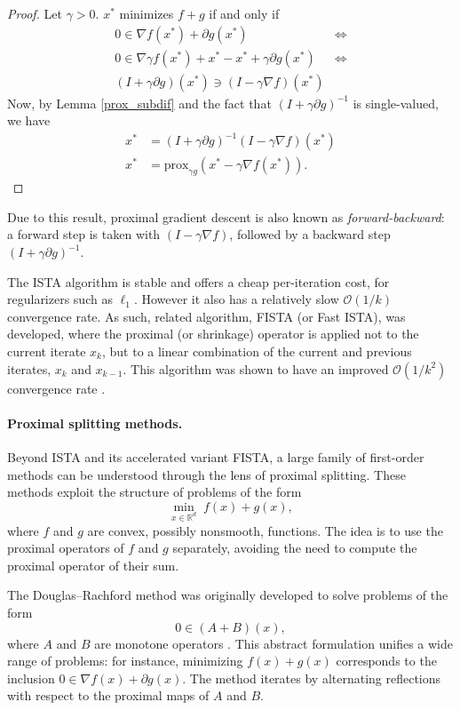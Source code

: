 \documentclass[11pt, twoside]{report}
\begin{document}
\begin{proof}
Let $\gamma>0$. $x^*$ minimizes $f+g$ if and only if
\begin{align*}
    0 \in \nabla f(x^*) + \partial g(x^*) &\iff \\
    0 \in \nabla \gamma f(x^*) + x^* - x^* + \gamma \partial g(x^*) &\iff \\
    (I + \gamma \partial g)(x^*) \ni (I - \gamma \nabla f)(x^*)
\end{align*}
Now, by Lemma \ref{prox_subdif} and the fact that $(I + \gamma \partial g)^{-1}$ is single-valued, we have
\begin{align*}
x^* &= (I + \gamma \partial g)^{-1}(I - \gamma \nabla f)(x^*) \\
x^* &= \mathrm{prox}_{\gamma g} \left(x^* - \gamma \nabla f(x^*)\right).
\end{align*}
\end{proof}
Due to this result, proximal gradient descent is also known as \textit{forward-backward}: a forward step is taken with $(I - \gamma \nabla f)$, followed by a backward step $(I + \gamma \partial g)^{-1}$.

The ISTA algorithm is stable and offers a cheap per-iteration cost, for regularizers such as $\ell_1$. However it also has a relatively slow $\mathcal{O}(1/k)$ convergence rate. As such, related algorithm, FISTA (or Fast ISTA), was developed, where the proximal (or shrinkage) operator is applied not to the current iterate $x_k$, but to a linear combination of the current and previous iterates, $x_k$ and $x_{k-1}$. This algorithm was shown to have an improved $\mathcal{O}(1/k^2)$ convergence rate \cite{beck2009fista}.

\paragraph{Proximal splitting methods.} 
Beyond ISTA and its accelerated variant FISTA, a large family of first-order methods can be understood through the lens of proximal splitting. These methods exploit the structure of problems of the form
\[
    \min_{x \in \mathbb{R}^d} \; f(x) + g(x),
\]
where $f$ and $g$ are convex, possibly nonsmooth, functions. The idea is to use the proximal operators of $f$ and $g$ separately, avoiding the need to compute the proximal operator of their sum.

The Douglas--Rachford method was originally developed to solve problems of the form 
\[
    0 \in (A+B)(x),
\]
where $A$ and $B$ are monotone operators \cite{douglas1956numerical}. This abstract formulation unifies a wide range of problems: for instance, minimizing $f(x)+g(x)$ corresponds to the inclusion $0 \in \nabla f(x) + \partial g(x)$. The method iterates by alternating reflections with respect to the proximal maps of $A$ and $B$.
\end{document}
